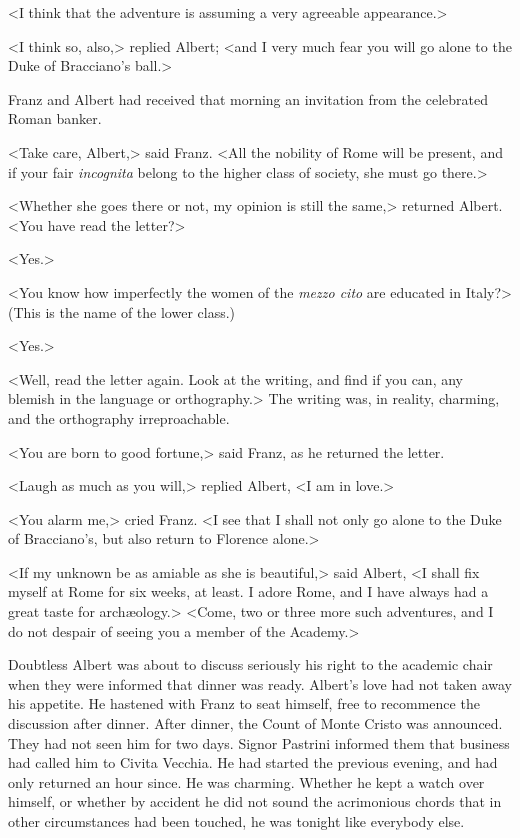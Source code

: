  <I think that the adventure is assuming a very agreeable appearance.> 

 <I think so, also,> replied Albert; <and I very much fear you will go alone to the Duke of Bracciano's ball.> 

 Franz and Albert had received that morning an invitation from the celebrated Roman banker. 

 <Take care, Albert,> said Franz. <All the nobility of Rome will be present, and if your fair \textit{incognita} belong to the higher class of society, she must go there.> 

 <Whether she goes there or not, my opinion is still the same,> returned Albert. <You have read the letter?> 

 <Yes.> 

 <You know how imperfectly the women of the \textit{mezzo cito} are educated in Italy?> (This is the name of the lower class.) 

 <Yes.> 

 <Well, read the letter again. Look at the writing, and find if you can, any blemish in the language or orthography.> The writing was, in reality, charming, and the orthography irreproachable. 

 <You are born to good fortune,> said Franz, as he returned the letter. 

 <Laugh as much as you will,> replied Albert, <I am in love.> 

 <You alarm me,> cried Franz. <I see that I shall not only go alone to the Duke of Bracciano's, but also return to Florence alone.> 

 <If my unknown be as amiable as she is beautiful,> said Albert, <I shall fix myself at Rome for six weeks, at least. I adore Rome, and I have always had a great taste for archæology.>  <Come, two or three more such adventures, and I do not despair of seeing you a member of the Academy.> 

 Doubtless Albert was about to discuss seriously his right to the academic chair when they were informed that dinner was ready. Albert's love had not taken away his appetite. He hastened with Franz to seat himself, free to recommence the discussion after dinner. After dinner, the Count of Monte Cristo was announced. They had not seen him for two days. Signor Pastrini informed them that business had called him to Civita Vecchia. He had started the previous evening, and had only returned an hour since. He was charming. Whether he kept a watch over himself, or whether by accident he did not sound the acrimonious chords that in other circumstances had been touched, he was tonight like everybody else. 

